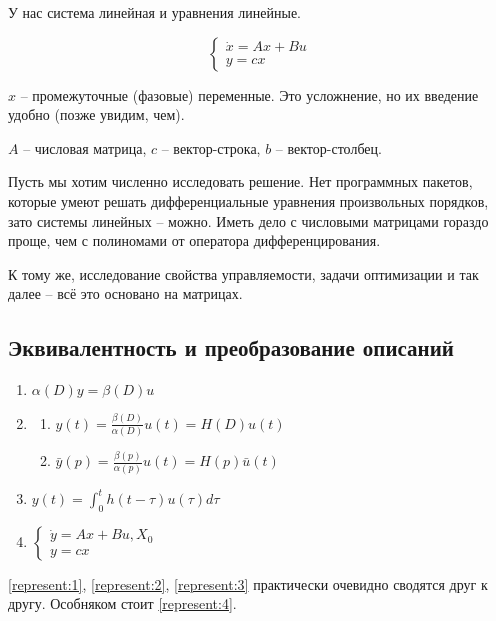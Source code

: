\documentclass[main.tex]{subfiles}
\begin{document}
У нас система линейная и уравнения линейные.

\begin{equation} \label{eq:fourth_form}
    \begin{cases}
        \dot x = Ax + Bu \\
        y = cx
    \end{cases}
\end{equation}

$ x $ -- промежуточные (фазовые) переменные.
Это усложнение, но их введение удобно (позже увидим, чем).

$ A $ -- числовая матрица, $ c $ -- вектор-строка, $ b $ -- вектор-столбец.

Пусть мы хотим численно исследовать решение.
Нет программных пакетов, которые умеют решать дифференциальные уравнения произвольных порядков, зато системы линейных -- можно.
Иметь дело с числовыми матрицами гораздо проще, чем с полиномами от оператора дифференцирования.

К тому же, исследование свойства управляемости, задачи оптимизации и так далее -- всё это основано на матрицах.

\subsection{Эквивалентность и преобразование описаний}

\begin{enumerate}[noitemsep]
	\item $ \alpha(D)y = \beta(D)u $ \label{represent:1}
	\item  \label{represent:2}
	\begin{enumerate}[noitemsep]
		\item $ y(t) = \frac{\beta(D)}{\alpha(D)}u(t) = H(D)u(t) $
		\item $ \bar y(p) = \frac{\beta(p)}{\alpha(p)}u(t) = H(p) \bar u(t) $
	\end{enumerate}
	\item \label{represent:3} $ y(t) = \int_{0}^{t} h(t-\tau) u(\tau) d\tau $
	\item $ \begin{cases}
        \dot y = Ax + Bu, X_0 \\
        y = cx
    \end{cases} $ \label{represent:4}
\end{enumerate}

\ref{represent:1}, \ref{represent:2}, \ref{represent:3} практически очевидно сводятся друг к другу.
Особняком стоит \ref{represent:4}.
\end{document}
